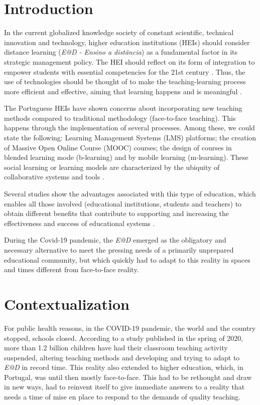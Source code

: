 \documentclass{textolivre}
\begin{document}
\section{Introduction}\label{sec-intro}
In the current globalized knowledge society of constant scientific, technical innovation and technology, higher education institutions (HEIs) should consider distance learning (\emph{E@D - Ensino a distância}) as a fundamental factor in its strategic management policy. The HEI should reflect on its form of integration to empower students with essential competencies for the 21st century \cite{rodrigues2015}. Thus, the use of technologies should be thought of to make the teaching-learning process more efficient and effective, aiming that learning happens and is meaningful \cite{konrath2009}.

The Portuguese HEIs have shown concerns about incorporating new teaching methods compared to traditional methodology (face-to-face teaching). This happens through the implementation of several processes. Among these, we could state the following: Learning Management Systems (LMS) platforms; the creation of Massive Open Online Course (MOOC) courses; the design of courses in blended learning mode (b-learning) and by mobile learning (m-learning). These social learning or learning models are characterized by the ubiquity of collaborative systems and tools \cite{oliveira2015}.

Several studies show the advantages associated with this type of education, which enables all those involved (educational institutions, students and teachers) to obtain different benefits that contribute to supporting and increasing the effectiveness and success of educational systems \cite{alsabawy2016, mattar2020}.

During the Covid-19 pandemic, the \emph{E@D} emerged as the obligatory and necessary alternative to meet the pressing needs of a primarily unprepared educational community, but which quickly had to adapt to this reality in spaces and times different from face-to-face reality.

\section{Contextualization}
For public health reasons, in the COVID-19 pandemic, the world and the country stopped, schools closed. According to a study published in the spring of 2020, more than 1.2 billion children have had their classroom teaching activity suspended, altering teaching methods and developing and trying to adapt to \emph{E@D} in record time. This reality also extended to higher education, which, in Portugal, was until then mostly face-to-face. This had to be rethought and draw in new ways, had to reinvent itself to give immediate answers to a reality that needs a time of mise en place to respond to the demands of quality teaching.
\end{document}
